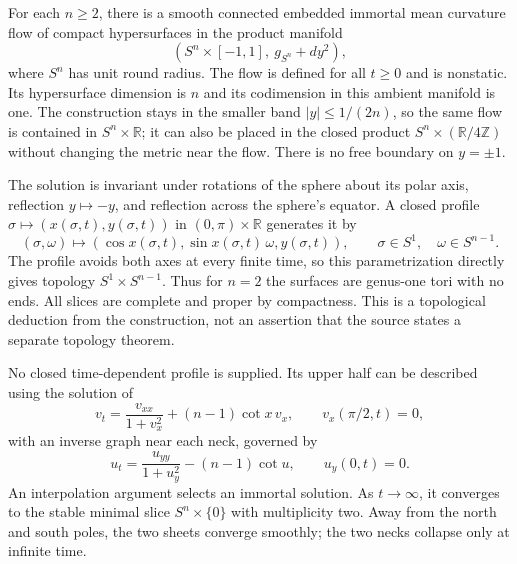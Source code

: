 \begin{example}\label{ex:catalogue-double-sphere-flow}
For each $n\geq2$, there is a smooth connected embedded immortal mean curvature flow of compact hypersurfaces in the product manifold
\[
 (S^n\times[-1,1],\ g_{S^n}+dy^2),
\]
where $S^n$ has unit round radius. The flow is defined for all $t\geq0$ and is nonstatic. Its hypersurface dimension is $n$ and its codimension in this ambient manifold is one. The construction stays in the smaller band $|y|\leq1/(2n)$, so the same flow is contained in $S^n\times\mathbb R$; it can also be placed in the closed product $S^n\times(\mathbb R/4\mathbb Z)$ without changing the metric near the flow. There is no free boundary on $y=\pm1$.

The solution is invariant under rotations of the sphere about its polar axis, reflection $y\mapsto-y$, and reflection across the sphere's equator. A closed profile $\sigma\mapsto(x(\sigma,t),y(\sigma,t))$ in $(0,\pi)\times\mathbb R$ generates it by
\[
 (\sigma,\omega)\longmapsto
 (\cos x(\sigma,t),\sin x(\sigma,t)\,\omega,y(\sigma,t)),
 \qquad \sigma\in S^1,\quad\omega\in S^{n-1}.
\]
The profile avoids both axes at every finite time, so this parametrization directly gives topology $S^1\times S^{n-1}$. Thus for $n=2$ the surfaces are genus-one tori with no ends. All slices are complete and proper by compactness. This is a topological deduction from the construction, not an assertion that the source states a separate topology theorem.

No closed time-dependent profile is supplied. Its upper half can be described using the solution of
\[
 v_t=\frac{v_{xx}}{1+v_x^2}+(n-1)\cot x\,v_x,
 \qquad v_x(\pi/2,t)=0,
\]
with an inverse graph near each neck, governed by
\[
 u_t=\frac{u_{yy}}{1+u_y^2}-(n-1)\cot u,
 \qquad u_y(0,t)=0.
\]
An interpolation argument selects an immortal solution. As $t\to\infty$, it converges to the stable minimal slice $S^n\times\{0\}$ with multiplicity two. Away from the north and south poles, the two sheets converge smoothly; the two necks collapse only at infinite time.


\end{example}
